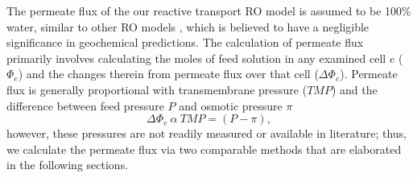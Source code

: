 \documentclass[journal=ACSES&TWater,manuscript=article]{achemso}
\begin{document}
The permeate flux of the our reactive transport RO model is assumed to be 100\% water, similar to other RO models \cite{Li2012OptimalDesalination}, which is believed to have a negligible significance in geochemical predictions. The calculation of permeate flux primarily involves calculating the moles of feed solution in any examined cell $e$ ($\Phi_e$) and the changes therein from permeate flux over that cell ($\Delta \Phi_{e}$). Permeate flux is generally proportional with transmembrane pressure ($TMP$) and the difference between feed pressure $P$ and osmotic pressure $\pi$ \cite{VanWagner2009EffectPerformance,Schock1987MassModules,Lonsdale1965TransportMembranes}
\begin{equation} \label{pressure_differential}
    \Delta \Phi_{e} ~ \alpha ~ TMP = (P - \pi),
\end{equation} 
however, these pressures are not readily measured or available in literature; thus, we calculate the permeate flux via two comparable methods that are elaborated in the following sections.
\end{document}
